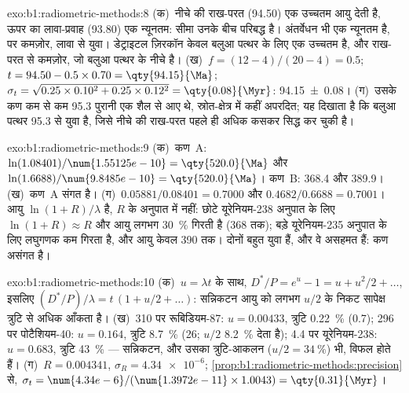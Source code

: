 \begin{solution}{exo:b1:radiometric-methods:8}
(क)~नीचे की राख-परत (\qty{94.50}{\Ma}) एक उच्चतम आयु देती है, ऊपर का लावा-प्रवाह (\qty{93.80}{\Ma}) एक न्यूनतम: सीमा उनके बीच परिबद्ध है। अंतर्वेधन भी एक न्यूनतम है, पर कमज़ोर, लावा से युवा। डेट्राइटल ज़िरकॉन केवल बलुआ पत्थर के लिए एक उच्चतम है, और राख-परत से कमज़ोर, जो बलुआ पत्थर के नीचे है। (ख)~$f = (12 - 4)/(20 - 4) = 0.5$; $t = 94.50 - 0.5 \times 0.70 =
\qty{94.15}{\Ma}$; $\sigma_t = \sqrt{0.25 \times 0.10^2 + 0.25 \times 0.12^2} =
\qty{0.08}{\Myr}$: \qty[uncertainty-mode=separate]{94.15(8)}{\Ma}। (ग)~उसके कण कम से कम \qty{95.3}{\Ma} पुरानी एक शैल से आए थे, स्रोत-क्षेत्र में कहीं अपरदित; यह दिखाता है कि बलुआ पत्थर \qty{95.3}{\Ma} से युवा है, जिसे नीचे की राख-परत पहले ही अधिक कसकर सिद्ध कर चुकी है।
\end{solution}

\begin{solution}{exo:b1:radiometric-methods:9}
(क)~कण~A: $\ln(1.08401)/\num{1.55125e-10} = \qty{520.0}{\Ma}$ और $\ln(1.6688)/\num{9.8485e-10} = \qty{520.0}{\Ma}$। कण~B: \qty{368.4}{\Ma} और \qty{389.9}{\Ma}। (ख)~कण~A संगत है। (ग)~$0.05881/0.08401 = 0.7000$ और $0.4682/0.6688 = 0.7001$। आयु $\ln(1 + R)/\lambda$ है, $R$ के अनुपात में नहीं: छोटे यूरेनियम-238 अनुपात के लिए $\ln(1+R) \approx R$ और आयु लगभग \qty{30}{\percent} गिरती है (\qty{368}{\Ma} तक); बड़े यूरेनियम-235 अनुपात के लिए लघुगणक कम गिरता है, और आयु केवल \qty{390}{\Ma} तक। दोनों बहुत युवा हैं, और वे असहमत हैं: कण असंगत है।
\end{solution}

\begin{solution}{exo:b1:radiometric-methods:10}
(क)~$u = \lambda t$ के साथ, $D^*/P = e^u - 1 = u + u^2/2 + \dots$, इसलिए $(D^*/P)/\lambda
= t\,(1 + u/2 + \dots)$: सन्निकटन आयु को लगभग $u/2$ के निकट सापेक्ष त्रुटि से अधिक आँकता है। (ख)~\qty{310}{\Ma} पर रूबिडियम-87: $u = 0.00433$, त्रुटि \qty{0.22}{\percent} (\qty{0.7}{\Myr}); \qty{296}{\Ma} पर पोटैशियम-40: $u =
0.164$, त्रुटि \qty{8.7}{\percent} (\qty{26}{\Myr}; $u/2$ \qty{8.2}{\percent} देता है); \qty{4.4}{\Ga} पर यूरेनियम-238: $u = 0.683$, त्रुटि \qty{43}{\percent} --- सन्निकटन, और उसका त्रुटि-आकलन ($u/2 = \qty{34}{\percent}$) भी, विफल होते हैं। (ग)~$R = 0.004341$, $\sigma_R = \num{4.34e-6}$; \cref{prop:b1:radiometric-methods:precision} से, $\sigma_t =
\num{4.34e-6}/(\num{1.3972e-11} \times 1.0043) = \qty{0.31}{\Myr}$।
\end{solution}


